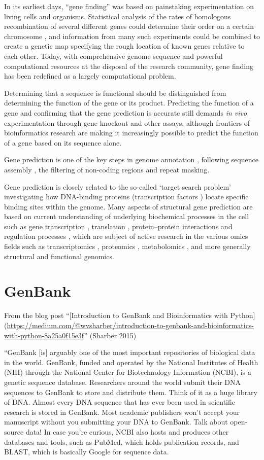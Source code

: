 \documentclass[
]{book}
\begin{document}
In its earliest days, ``gene finding'' was based on painstaking experimentation on living cells and organisms. Statistical analysis of the rates of homologous recombination of several different genes could determine their order on a certain chromosome , and information from many such experiments could be combined to create a genetic map specifying the rough location of known genes relative to each other. Today, with comprehensive genome sequence and powerful computational resources at the disposal of the research community, gene finding has been redefined as a largely computational problem.

Determining that a sequence is functional should be distinguished from determining the function of the gene or its product. Predicting the function of a gene and confirming that the gene prediction is accurate still demands \emph{in vivo} experimentation through gene knockout and other assays, although frontiers of bioinformatics research are making it increasingly possible to predict the function of a gene based on its sequence alone.

Gene prediction is one of the key steps in genome annotation , following sequence assembly , the filtering of non-coding regions and repeat masking.

Gene prediction is closely related to the so-called `target search problem' investigating how DNA-binding proteins (transcription factors ) locate specific binding sites within the genome. Many aspects of structural gene prediction are based on current understanding of underlying biochemical processes in the cell such as gene transcription , translation , protein--protein interactions and regulation processes , which are subject of active research in the various omics fields such as transcriptomics , proteomics , metabolomics , and more generally structural and functional genomics.

\hypertarget{genbank}{%
\section{GenBank}\label{genbank}}

From the blog post ``{[}Introduction to GenBank and Bioinformatics with Python{]}(\url{https://medium.com/@wvsharber/introduction-to-genbank-and-bioinformatics-with-python-8a25a0f15e3f}'' (Sharber 2015)

``GenBank {[}is{]} arguably one of the most important repositories of biological data in the world. GenBank, funded and operated by the National Institutes of Health (NIH) through the National Center for Biotechnology Information (NCBI), is a genetic sequence database. Researchers around the world submit their DNA sequences to GenBank to store and distribute them. Think of it as a huge library of DNA. Almost every DNA sequence that has ever been used in scientific research is stored in GenBank. Most academic publishers won't accept your manuscript without you submitting your DNA to GenBank. Talk about open-source data! In case you're curious, NCBI also hosts and produces other databases and tools, such as PubMed, which holds publication records, and BLAST, which is basically Google for sequence data.
\end{document}
